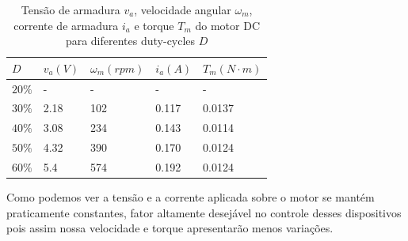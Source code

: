\documentclass{article}
\begin{document}
\begin{table}[H]
	\centering
	\caption{Tensão de armadura $v_a$, velocidade angular $\omega_m$, corrente de armadura $i_a$ e torque $T_m$ do motor DC para diferentes duty-cycles $D$}
	\label{tab:vabuck}
	\begin{tabular}{|l|l|l|l|l|}
		\hline
		$D$    & $v_a (V)$ & $\omega_m (rpm)$ & $i_a (A)$ & $T_m (N\cdot m)$ \\ \hline
		$20\%$ & -     & -          & -         & -           \\ \hline
		$30\%$ & 2.18  & 102        & 0.117     & 0.0137      \\ \hline
		$40\%$ & 3.08  & 234        & 0.143     & 0.0114       \\ \hline
		$50\%$ & 4.32  & 390        & 0.170     & 0.0124       \\ \hline
		$60\%$ & 5.4   & 574        & 0.192     & 0.0124       \\ \hline
	\end{tabular}
\end{table}

Como podemos ver a tensão e a corrente aplicada sobre o motor se mantém praticamente constantes, fator altamente desejável no controle desses dispositivos pois assim nossa velocidade e torque apresentarão menos variações.
\end{document}
